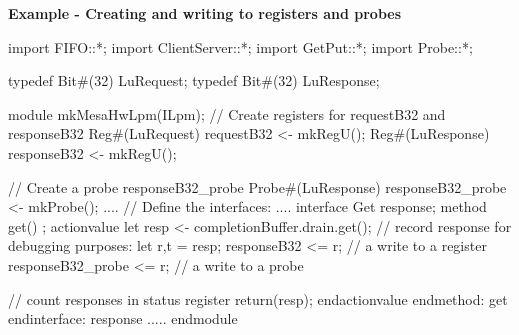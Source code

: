 {\bf Example - Creating and writing to registers and probes}
\begin{libverbatim}
import FIFO::*;
import ClientServer::*;
import GetPut::*;
import Probe::*;

typedef Bit#(32) LuRequest;
typedef Bit#(32) LuResponse;

module mkMesaHwLpm(ILpm);
   // Create registers for requestB32 and responseB32 
   Reg#(LuRequest) requestB32 <- mkRegU(); 
   Reg#(LuResponse) responseB32 <- mkRegU();
   
   // Create a probe responseB32_probe
   Probe#(LuResponse) responseB32_probe <- mkProbe();
   ....    
   // Define the interfaces:
   ....     
      interface Get  response;
         method get() ;
            actionvalue
               let resp <- completionBuffer.drain.get();
               // record response for debugging purposes:
               let {r,t} = resp;
               responseB32 <= r;        // a write to a register                
               responseB32_probe <= r;  // a write to a probe
      
               // count responses in status register
               return(resp);
            endactionvalue
         endmethod: get
      endinterface: response
    .....
endmodule
\end{libverbatim}


